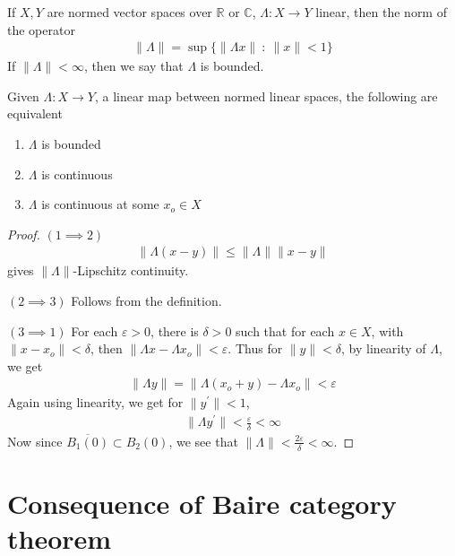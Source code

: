 \begin{definition}
  If $X, Y$ are normed vector spaces over $\mathbb{R}$ or
  $\mathbb{C}$, $\Lambda: X \to Y$ linear, then the norm of the operator
  \begin{align*}
    \|\Lambda\| = \sup \{ \|\Lambda x\|  \ : \  \|x\|< 1 \}
  \end{align*}
  If $\|\Lambda\| < \infty$, then we say that $\Lambda$ is bounded.
\end{definition}

\begin{proposition}
  Given $\Lambda: X \to Y$, a linear map between normed linear
  spaces, the following are equivalent
  \begin{enumerate}[label=(\arabic*)]
    \item $\Lambda$ is bounded
    \item $\Lambda$ is continuous
    \item $\Lambda$ is continuous at some $x_o \in X$
  \end{enumerate}
\end{proposition}
\begin{proof}
  $(1 \implies 2)$
  \begin{align*}
    \|\Lambda(x - y)\| \le \|\Lambda\| \|x - y\|
  \end{align*}
  gives $\|\Lambda\|$-Lipschitz continuity.

  $(2 \implies 3)$ Follows from the definition.

  $(3 \implies 1)$ For each $\varepsilon > 0$, there is $\delta > 0$
  such that for each $x \in X$, with $\|x - x_o\| < \delta$, then
  $\|\Lambda x - \Lambda x_o\| < \varepsilon$.
  Thus for $ \|y \| < \delta$,  by linearity of $\Lambda$, we get
  \begin{align*}
    \|\Lambda y\| = \|\Lambda(x_o + y) - \Lambda x_o\| < \varepsilon
  \end{align*}
  Again using linearity, we get for $\|y^\prime\| < 1$,
  \begin{align*}
    \|\Lambda y^\prime\| < \frac{\varepsilon}{\delta} < \infty
  \end{align*}
  Now since $\overline{ B_1(0)} \subset B_2(0)$, we see that
  $\|\Lambda\| < \frac{2\varepsilon}{\delta} < \infty$.
\end{proof}

\section{Consequence of Baire category theorem}

